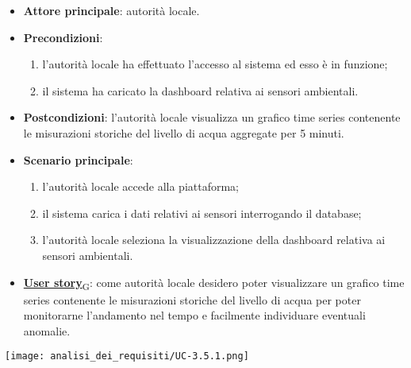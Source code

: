 \begin{itemize}
	\item \textbf{Attore principale}: autorità locale.
	\item \textbf{Precondizioni}:
	      \begin{enumerate}
		      \item l'autorità locale ha effettuato l'accesso al sistema ed esso è in funzione;
		      \item il sistema ha caricato la dashboard relativa ai sensori ambientali.
	      \end{enumerate}
	\item \textbf{Postcondizioni}: l'autorità locale visualizza un grafico time series contenente le misurazioni storiche
	      del livello di acqua aggregate per 5 minuti.
	\item \textbf{Scenario principale}:
	      \begin{enumerate}
		      \item l'autorità locale accede alla piattaforma;
		      \item il sistema carica i dati relativi ai sensori interrogando il database;
		      \item l'autorità locale seleziona la visualizzazione della dashboard relativa ai sensori ambientali.
	      \end{enumerate}
	\item \href{https://7last.github.io/docs/pb/documentazione-interna/glossario\#user-story}{\textbf{User story}\textsubscript{G}}:
	      come autorità locale desidero poter visualizzare un grafico time series contenente le misurazioni storiche
	      del livello di acqua per poter monitorarne l'andamento nel tempo e facilmente individuare eventuali anomalie.
\end{itemize}
\begin{center}
	\texttt{[image: analisi\_dei\_requisiti/UC-3.5.1.png]}
\end{center}


